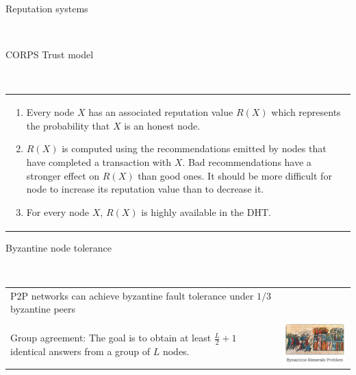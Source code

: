 \documentclass[12pt]{beamer}
\renewcommand{\frametitle}[1]{\vspace{0.2cm}\begin{huge}#1\end{huge}\\}
\renewcommand{\framesubtitle}[1]{\vspace{0.4cm} \hspace{0.4cm}\begin{large}#1\end{large}\\}
\begin{document}
  \begin{frame}
  \frametitle{Reputation systems}
  \framesubtitle{CORPS Trust model}
  \begin{table}
  \begin{tabular}{p{11cm}}
    \begin{enumerate}
      \item Every node $X$ has an associated reputation value $R(X)$
      which represents the probability that $X$ is an honest node.
      \item $R(X)$ is computed using the recommendations emitted
      by nodes that have completed a transaction with $X$. Bad
      recommendations have a stronger effect on $R(X)$ than
      good ones. It should be more difficult for node to
      increase its reputation value than to decrease it.
      \item For every node $X$, $R(X)$ is highly available in the DHT.
    \end{enumerate}
  \end{tabular}
  \end{table}
  \end{frame}
  
  
  \begin{frame}
  \frametitle{Byzantine node tolerance}
  \begin{table}
  \begin{tabular}{p{7cm}p{3cm}}
    P2P networks can achieve byzantine fault tolerance under $1/3$ byzantine
    peers\\

    \\Group agreement:
    The goal is to obtain at least $\frac{L}{2} + 1$ identical answers from a
group of $L$ nodes.
  &
  \vspace{1.5cm}
  \includegraphics[width=4cm]{../../presentacion/img/bizantine_generals_problem}\\
  \end{tabular}
  \end{table}
  \end{frame}


\end{document}
